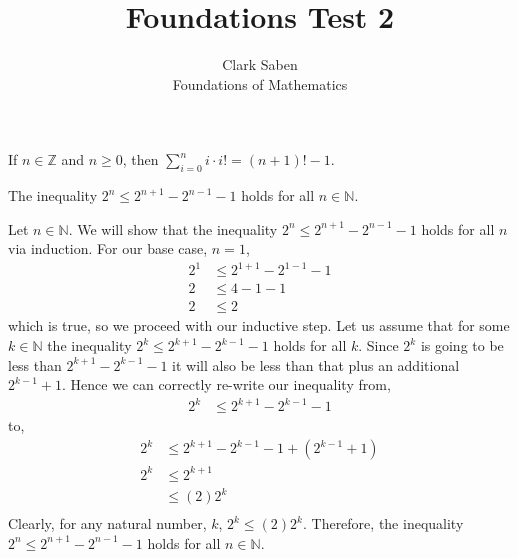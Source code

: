 \documentclass[12pt]{article}
\newenvironment{theorem}[2][Theorem]{\begin{trivlist}
\item[\hskip \labelsep {\bfseries #1}\hskip \labelsep {\bfseries #2.}]}{\end{trivlist}}
\begin{document}
 
 
\title{Foundations Test 2}%
\author{Clark Saben\\ %
Foundations of Mathematics} %
 
\maketitle

\section{}
\begin{theorem}1
	If $n \in \mathbb{Z}$ and $n \geq 0$, then $\sum_{i=0}^{n}i\cdot i! = \left(n+1 \right)!-1$.
\end{theorem}
\begin{theorem}2
	The inequality $2^n \leq 2^{n+1}-2^{n-1}-1$ holds for all $n \in \mathbb{N}$.

	Let $n \in \mathbb{N}$. We will show that 
	the inequality $2^n \leq 2^{n+1}-2^{n-1}-1$ holds for all $n$
	via induction. For our base case, $n=1$,
	\begin{align*}
		2^{1} &\leq 2^{1+1} -2^{1-1}-1\\
		2 &\leq 4-1-1\\
		2 &\leq 2
	\end{align*}
	which is true, so we proceed with our inductive step. Let us assume that for some $k \in \mathbb{N}$
	the inequality $2^k \leq 2^{k+1}-2^{k-1}-1$ holds for all $k$. Since $2^k$ is going to be less
	than $2^{k+1}-2^{k-1}-1$ it will also be less than that plus an additional $2^{k-1}+1$. Hence we can correctly
	re-write our inequality from,
	\begin{align*}
		2^k &\leq 2^{k+1}-2^{k-1}-1
	\end{align*}
	to,
	\begin{align*}
		2^k &\leq 2^{k+1}-2^{k-1}-1 + (2^{k-1}+1)\\
		2^k &\leq 2^{k+1}\\
		    &\leq (2)2^k\\
	\end{align*}
	Clearly, for any natural number, $k$, $2^k \leq (2)2^k$. Therefore,
	the inequality $2^n \leq 2^{n+1}-2^{n-1}-1$ holds for all $n \in \mathbb{N}$.
\end{theorem}
\end{document}
